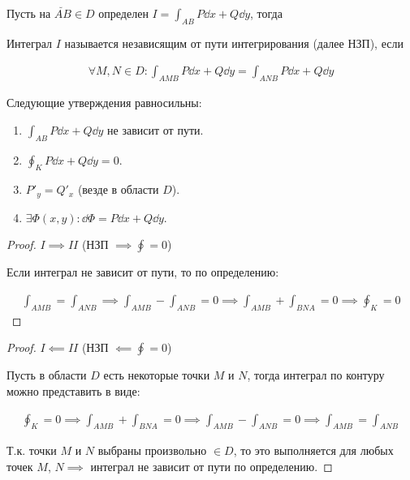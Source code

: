 
Пусть на \(\breve{AB} \in D\) определен \(I = \int_{AB} P \dd x + Q \dd y\),
тогда

\begin{definition}
  Интеграл \(I\) называется независящим от пути интегрирования (далее НЗП), если

  \begin{align*}
    \forall M, N \in D \colon
    \int_{AMB} P\dd x + Q \dd y = \int_{ANB} P\dd x + Q \dd y 
  \end{align*}
\end{definition}

\begin{theorem}\label{path-ind-cr}
  Следующие утверждения равносильны:
  \begin{enumerate}[label = \Roman*.]
    \item \(\int_{AB} P \dd x + Q \dd y\) не зависит от пути.
    \item \(\oint_{K} P \dd x + Q \dd y = 0\).
    \item \(P'_{y} = Q'_{x}\) (везде в области \(D\)).
    \item \(\exists \Phi(x, y) \colon \dd \Phi = P \dd x + Q \dd y\).
  \end{enumerate}
\end{theorem}
\begin{proof}
  \(I \implies II\) (НЗП \(\implies \oint = 0\))

  Если интеграл не зависит от пути, то по определению:

  \begin{align*}
    \int_{AMB} = \int_{ANB}
    \implies \int_{AMB} - \int_{ANB} = 0
    \implies \int_{AMB} + \int_{BNA} = 0
    \implies \oint_{K} = 0
  \end{align*}
\end{proof}
\begin{proof}
  \(I \impliedby II\) (НЗП \(\impliedby \oint = 0\))

  Пусть в области \(D\) есть некоторые точки \(M\) и \(N\), тогда интеграл по
  контуру можно представить в виде:

  \begin{align*}
    \oint_{K} = 0
    \implies \int_{AMB} + \int_{BNA} = 0
    \implies \int_{AMB} - \int_{ANB} = 0
    \implies \int_{AMB} = \int_{ANB}
  \end{align*}

  Т.к. точки \(M\) и \(N\) выбраны произвольно \(\in D\), то это выполняется для
  любых точек \(M\), \(N \implies\) интеграл не зависит от пути по определению.
\end{proof}
